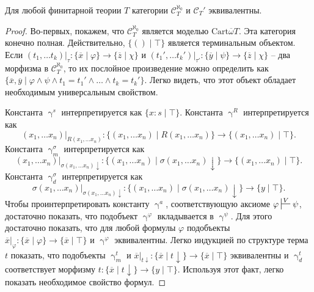 \documentclass[reqno]{amsart}
\theoremstyle{definition}
\theoremstyle{remark}
\newcommand{\cat}[1]{\mathcal{#1}}
\begin{document}
\begin{prop}
Для любой финитарной теории $T$ категории $\cat{C}_T^{\aleph_0}$ и $\cat{C}_T'$ эквивалентны.
\end{prop}
\begin{proof}
Во-первых, покажем, что $\cat{C}_T^{\aleph_0}$ является моделью $\mathrm{Cart} \overline{\omega} T$.
Эта категория конечно полная.
Действительно, $\{ () \mid \top \}$ является терминальным объектом.
Если $(t_1, \ldots t_k)|_\tau : \{ \overline{x} \mid \varphi \} \to \{ \overline{z} \mid \chi \}$ и $(t_1', \ldots t_k')|_{\tau'} : \{ \overline{y} \mid \psi \} \to \{ \overline{z} \mid \chi \}$ -- два морфизма в $\cat{C}_T^{\aleph_0}$,
то их послойное произведение можно определить как $\{ \overline{x}, \overline{y} \mid \varphi \land \psi \land t_1 = t_1' \land \ldots \land t_k = t_k' \}$.
Легко видеть, что этот объект обладает необходимым универсальным свойством.

Константа $\upgamma^s$ интерпретируется как $\{ x : s \mid \top \}$.
Константа $\upgamma^R$ интерпретируется как
\[ (x_1, \ldots x_n)|_{R(x_1, \ldots x_n)} : \{ (x_1, \ldots x_n) \mid R(x_1, \ldots x_n) \} \to \{ (x_1, \ldots x_n) \mid \top \}. \]
Константа $\upgamma^\sigma_m$ интерпретируется как
\[ (x_1, \ldots x_n)|_{\sigma(x_1, \ldots x_n) \downarrow} : \{ (x_1, \ldots x_n) \mid \sigma(x_1, \ldots x_n)\!\downarrow \} \to \{ (x_1, \ldots x_n) \mid \top \}. \]
Константа $\upgamma^\sigma_d$ интерпретируется как
\[ \sigma(x_1, \ldots x_n)|_{\sigma(x_1, \ldots x_n) \downarrow} : \{ (x_1, \ldots x_n) \mid \sigma(x_1, \ldots x_n)\!\downarrow \} \to \{ y \mid \top \}. \]
Чтобы проинтерпретировать константу $\upgamma^a$, соответствующую аксиоме $\varphi \sststile{}{V} \psi$, достаточно показать, что подобъект $\upgamma^\varphi$ вкладывается в $\upgamma^\psi$.
Для этого достаточно показать, что для любой формулы $\varphi$ подобъекты $\overline{x}|_\varphi : \{ \overline{x} \mid \varphi \} \to \{ \overline{x} \mid \top \}$ и $\upgamma^\varphi$ эквивалентны.
Легко индукцией по структуре терма $t$ показать, что подобъекты $\upgamma^t_m$ и $\overline{x}|_{t \downarrow} : \{ \overline{x} \mid t\!\downarrow \} \to \{ \overline{x} \mid \top \}$ эквивалентны
и $\upgamma^t_d$ соответствует морфизму $t : \{ \overline{x} \mid t\!\downarrow \} \to \{ y \mid \top \}$.
Используя этот факт, легко показать необходимое свойство формул.


\end{proof}
\end{document}
